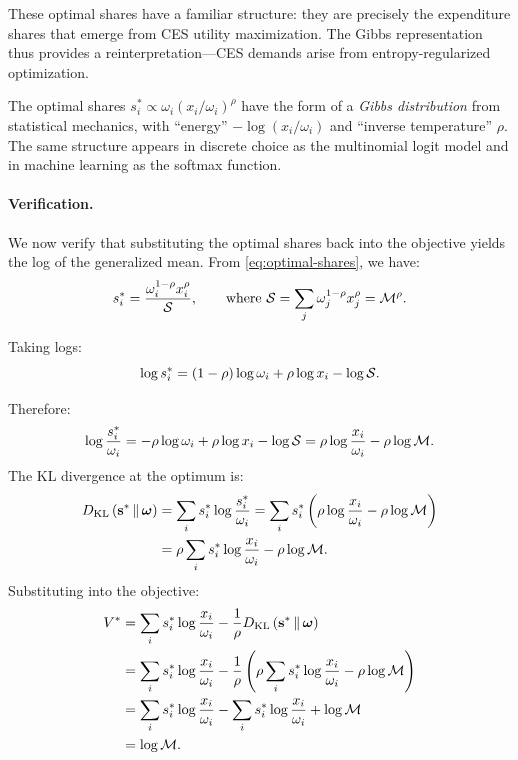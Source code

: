 These optimal shares have a familiar structure: they are precisely the expenditure shares that emerge from CES utility maximization. The Gibbs representation thus provides a reinterpretation---CES demands arise from entropy-regularized optimization.

\begin{calloutnote}
The optimal shares $s_i^* \propto \omega_i (x_i/\omega_i)^\rho$ have the form of a \emph{Gibbs distribution} from statistical mechanics, with ``energy'' $-\log(x_i/\omega_i)$ and ``inverse temperature'' $\rho$. The same structure appears in discrete choice as the multinomial logit model and in machine learning as the softmax function.
\end{calloutnote}

\paragraph{Verification.}

We now verify that substituting the optimal shares back into the objective yields the log of the generalized mean. From \cref{eq:optimal-shares}, we have:
\begin{equation}
s_i^* = \frac{\omega_i^{1-\rho} x_i^\rho}{\mathcal{S}}, \qquad \text{where } \mathcal{S} = \sum_j \omega_j^{1-\rho} x_j^\rho = \mathcal{M}^\rho.
\end{equation}

Taking logs:
\begin{equation}
\log s_i^* = (1-\rho)\log \omega_i + \rho \log x_i - \log \mathcal{S}.
\end{equation}

Therefore:
\begin{equation}
\log \frac{s_i^*}{\omega_i} = -\rho \log \omega_i + \rho \log x_i - \log \mathcal{S} = \rho \log \frac{x_i}{\omega_i} - \rho \log \mathcal{M}.
\end{equation}
The KL divergence at the optimum is:
\begin{align}
D_{\mathrm{KL}}\left(\mathbf{s}^* \,\|\, \boldsymbol{\omega}\right) &= \sum_i s_i^* \log \frac{s_i^*}{\omega_i} = \sum_i s_i^* \left( \rho \log \frac{x_i}{\omega_i} - \rho \log \mathcal{M} \right) \nonumber \\
&= \rho \sum_i s_i^* \log \frac{x_i}{\omega_i} - \rho \log \mathcal{M}.
\end{align}
Substituting into the objective:
\begin{align}
V^* &= \sum_i s_i^* \log \frac{x_i}{\omega_i} - \frac{1}{\rho} D_{\mathrm{KL}}\left(\mathbf{s}^* \,\|\, \boldsymbol{\omega}\right) \nonumber \\
&= \sum_i s_i^* \log \frac{x_i}{\omega_i} - \frac{1}{\rho} \left( \rho \sum_i s_i^* \log \frac{x_i}{\omega_i} - \rho \log \mathcal{M} \right) \nonumber \\
&= \sum_i s_i^* \log \frac{x_i}{\omega_i} - \sum_i s_i^* \log \frac{x_i}{\omega_i} + \log \mathcal{M} \nonumber \\
&= \log \mathcal{M}.
\end{align}

